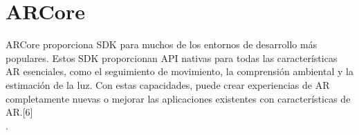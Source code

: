 \section{ARCore}
ARCore proporciona SDK para muchos de los entornos de desarrollo más populares. Estos SDK proporcionan API nativas para todas las características AR esenciales, como el seguimiento de movimiento, la comprensión ambiental y la estimación de la luz. Con estas capacidades, puede crear experiencias de AR completamente nuevas o mejorar las aplicaciones existentes con características de AR.[6] \\.\par 

